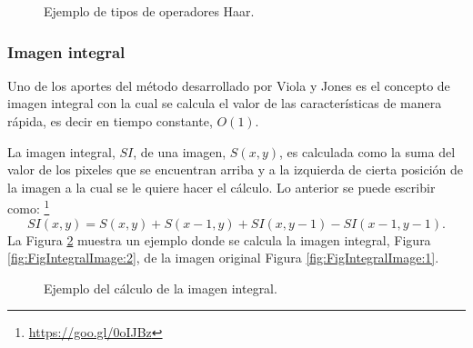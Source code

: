 \begin{figure}[h!]
\caption{Ejemplo de tipos de operadores Haar.} \label{fig:haarFeatures}
\end{figure}


\subsubsection{Imagen integral}\label{sssec:IntegralImage} 

Uno de los aportes del método desarrollado por Viola y Jones es el concepto de imagen integral con la cual se calcula el valor de las características de manera rápida, es decir en tiempo constante, $O(1)$.  

La imagen integral, $SI$, de una imagen, $S(x,y)$, es calculada como la suma del valor de los pixeles que se encuentran arriba y a la izquierda de cierta posición de la imagen a la cual se le quiere hacer el cálculo. Lo anterior se puede escribir como: \footnote{\url{https://goo.gl/0oIJBz}}   
\begin{equation}
SI(x,y)=S(x,y) + S(x-1,y) + SI(x,y-1)-SI(x-1,y-1).
\end{equation}   
La Figura \ref{fig:FigIntegralImage} muestra un  ejemplo donde se calcula la imagen integral, Figura \ref{fig:FigIntegralImage:2}, de la imagen original Figura \ref{fig:FigIntegralImage:1}.
\begin{figure}[h!]
\centering
{} \qquad
{}
\caption{Ejemplo del cálculo de la imagen integral.} 
\label{fig:FigIntegralImage}
\end{figure}

